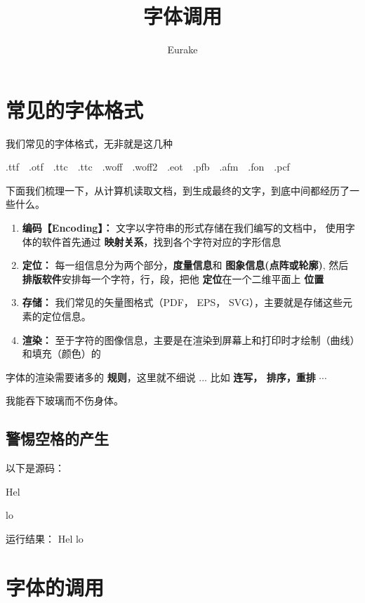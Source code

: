 \documentclass[fontset=windows, 12pt]{article}
\title{字体调用}
\author{Eurake}
\date{}
\begin{document}
\maketitle

\section{常见的字体格式}
我们常见的字体格式，无非就是这几种

\begin{framed}
    {\ttfamily .ttf~~.otf~~.ttc~~.ttc~~.woff~~.woff2~~.eot~~.pfb~~.afm~~.fon~~.pcf}
\end{framed}


下面我们梳理一下，从计算机读取文档，到生成最终的文字，到底中间都经历了一些什么。
\begin{framed}
\begin{enumerate}
    \item \textbf{编码【Encoding】：} 文字以字符串的形式存储在我们编写的文档中，
        使用字体的软件首先通过 \textbf{映射关系}，找到各个字符对应的字形信息
    \item \textbf{定位：} 每一组信息分为两个部分，\textbf{度量信息}和 \textbf{图象信息(点阵或轮廓)}, 
        然后 \textbf{排版软件}安排每一个字符，行，段，把他 \textbf{定位}在一个二维平面上 \textbf{位置}
    \item \textbf{存储：} 我们常见的矢量图格式（PDF， EPS， SVG），主要就是存储这些元素的定位信息。
    \item \textbf{渲染：} 至于字符的图像信息，主要是在渲染到屏幕上和打印时才绘制（曲线）和填充（颜色）的
\end{enumerate}
\end{framed}

字体的渲染需要诸多的 \textbf{规则}，这里就不细说 ... 
比如 \textbf{连写， 排序，重排} $\cdots$

{
    \ttfamily
    我能吞下玻璃而不伤身体。
}

\subsection{警惕空格的产生}
\begin{framed}
\parbox[l][4em][l]{0.5\linewidth}{
以下是源码：

{\ttfamily
Hel

lo%
}}
\parbox[l][4em][l]{0.45\linewidth}{
运行结果：
Hel
lo
}%
\end{framed}

\clearpage
\section{字体的调用}
\end{document}
